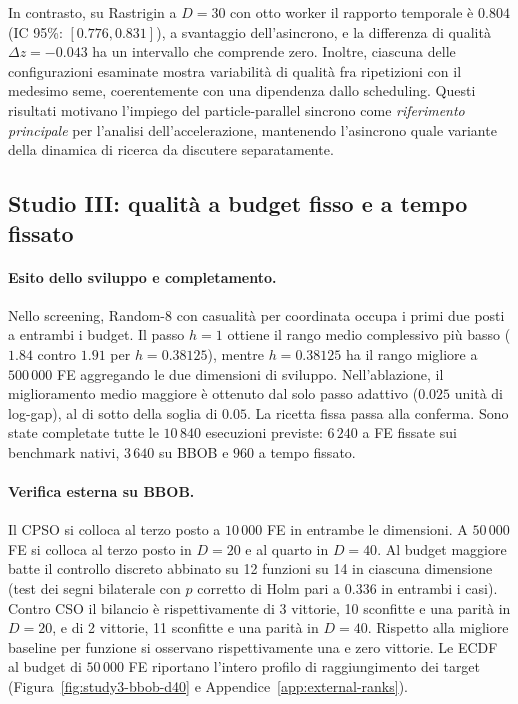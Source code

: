 In contrasto, su Rastrigin a $D=30$ con otto worker il rapporto temporale è $0.804$ (IC 95\%: $[0.776,0.831]$), a svantaggio dell'asincrono, e la differenza di qualità $\Delta z=-0.043$ ha un intervallo che comprende zero. Inoltre, ciascuna delle configurazioni esaminate mostra variabilità di qualità fra ripetizioni con il medesimo seme, coerentemente con una dipendenza dallo scheduling. Questi risultati motivano l'impiego del particle-parallel sincrono come \emph{riferimento principale} per l'analisi dell'accelerazione, mantenendo l'asincrono quale variante della dinamica di ricerca da discutere separatamente.

\subsection{Studio III: qualità a budget fisso e a tempo fissato}\label{subsec:res-scope}
\paragraph{Esito dello sviluppo e completamento.}
Nello screening, Random-8 con casualità per coordinata occupa i primi due posti a entrambi i budget. Il passo $h=1$ ottiene il rango medio complessivo più basso ($1.84$ contro $1.91$ per $h=0.38125$), mentre $h=0.38125$ ha il rango migliore a $500\,000$ FE aggregando le due dimensioni di sviluppo. Nell'ablazione, il miglioramento medio maggiore è ottenuto dal solo passo adattivo ($0.025$ unità di log-gap), al di sotto della soglia di $0.05$. La ricetta fissa passa alla conferma. Sono state completate tutte le $10\,840$ esecuzioni previste: $6\,240$ a FE fissate sui benchmark nativi, $3\,640$ su BBOB e $960$ a tempo fissato.

\paragraph{Verifica esterna su BBOB.}
Il CPSO si colloca al terzo posto a $10\,000$ FE in entrambe le dimensioni. A $50\,000$ FE si colloca al terzo posto in $D=20$ e al quarto in $D=40$. Al budget maggiore batte il controllo discreto abbinato su 12 funzioni su 14 in ciascuna dimensione (test dei segni bilaterale con $p$ corretto di Holm pari a $0.336$ in entrambi i casi). Contro CSO il bilancio è rispettivamente di 3 vittorie, 10 sconfitte e una parità in $D=20$, e di 2 vittorie, 11 sconfitte e una parità in $D=40$. Rispetto alla migliore baseline per funzione si osservano rispettivamente una e zero vittorie. Le ECDF al budget di $50\,000$ FE riportano l'intero profilo di raggiungimento dei target (Figura~\ref{fig:study3-bbob-d40} e Appendice~\ref{app:external-ranks}).


